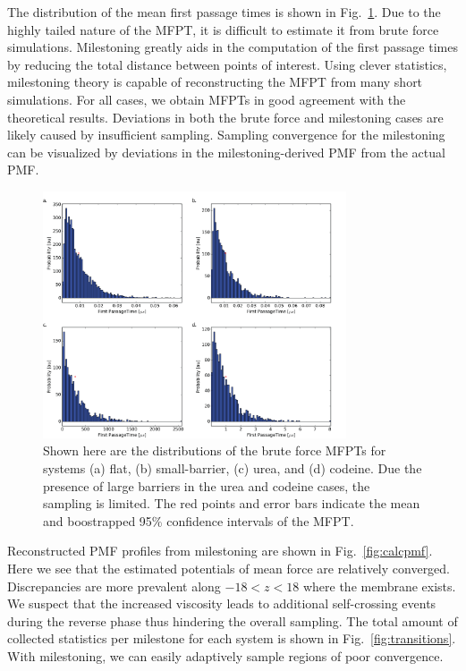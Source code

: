 
    \par The distribution of the mean first passage times is shown in Fig.~\ref{fig:mfpts}. Due to the highly tailed nature of the MFPT, it is difficult to estimate it from brute force simulations. Milestoning greatly aids in the computation of the first passage times by reducing the total distance between points of interest. Using clever statistics, milestoning theory is capable of reconstructing the MFPT from many short simulations. For all cases, we obtain MFPTs in good agreement with the theoretical results. Deviations in both the brute force and milestoning cases are likely caused by insufficient sampling. Sampling convergence for the milestoning can be visualized by deviations in the milestoning-derived PMF from the actual PMF.

    \begin{figure}[!htbp]
    \begin{center}
        \includegraphics[width=0.8\textwidth]{Figures/mfptdist}
        \caption[Distributions of brute force MFPTS for systems (a) flat, (b) small-barrier, (c) urea, and (d) codeine]{Shown here are the distributions of the brute force MFPTs for systems (a) flat, (b) small-barrier, (c) urea, and (d) codeine. Due the presence of large barriers in the urea and codeine cases, the sampling is limited. The red points and error bars indicate the mean and boostrapped 95\% confidence intervals of the MFPT.}
        \label{fig:mfpts}
    \end{center}
    \end{figure}

    \par Reconstructed PMF profiles from milestoning are shown in Fig.~\ref{fig:calcpmf}. Here we see that the estimated potentials of mean force are relatively converged. Discrepancies are more prevalent along $-18<z<18$ where the membrane exists. We suspect that the increased viscosity leads to additional self-crossing events during the reverse phase thus hindering the overall sampling. The total amount of collected statistics per milestone for each system is shown in Fig.~\ref{fig:transitions}. With milestoning, we can easily adaptively sample regions of poor convergence.

